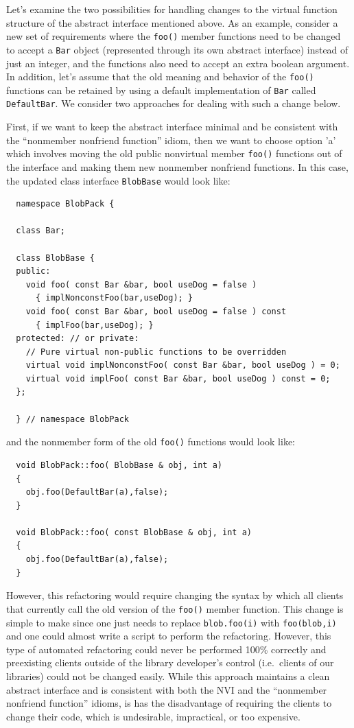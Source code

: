 \documentclass[pdf,ps2pdf,11pt]{SANDreport}
\begin{document}
Let's examine the two possibilities for handling changes to the virtual
function structure of the abstract interface mentioned above.  As an example,
consider a new set of requirements where the {}\texttt{foo()} member functions
need to be changed to accept a {}\texttt{Bar} object (represented through its
own abstract interface) instead of just an integer, and the functions also
need to accept an extra boolean argument.  In addition, let's assume that the
old meaning and behavior of the {}\texttt{foo()} functions can be retained by
using a default implementation of {}\texttt{Bar} called {}\texttt{DefaultBar}.
We consider two approaches for dealing with such a change below.

First, if we want to keep the abstract interface minimal and be consistent
with the ``nonmember nonfriend function'' idiom, then we want to choose option
'a' which involves moving the old public nonvirtual member {}\texttt{foo()}
functions out of the interface and making them new nonmember nonfriend
functions.  In this case, the updated class interface {}\texttt{BlobBase}
would look like:

{\small\begin{verbatim}
  namespace BlobPack {

  class Bar;

  class BlobBase {
  public:
    void foo( const Bar &bar, bool useDog = false )
      { implNonconstFoo(bar,useDog); }
    void foo( const Bar &bar, bool useDog = false ) const
      { implFoo(bar,useDog); }
  protected: // or private:
    // Pure virtual non-public functions to be overridden
    virtual void implNonconstFoo( const Bar &bar, bool useDog ) = 0;
    virtual void implFoo( const Bar &bar, bool useDog ) const = 0;
  };

  } // namespace BlobPack
\end{verbatim}}

{}\noindent{}and the nonmember form of the old {}\texttt{foo()} functions
would look like:

{\small\begin{verbatim}
  void BlobPack::foo( BlobBase & obj, int a)
  {
    obj.foo(DefaultBar(a),false);
  }

  void BlobPack::foo( const BlobBase & obj, int a)
  {
    obj.foo(DefaultBar(a),false);
  }
\end{verbatim}}

However, this refactoring would require changing the syntax by which all
clients that currently call the old version of the {}\texttt{foo()} member
function.  This change is simple to make since one just needs to replace
{}\texttt{blob.foo(i)} with {}\texttt{foo(blob,i)} and one could almost write
a script to perform the refactoring.  However, this type of automated
refactoring could never be performed 100\% correctly and preexisting clients
outside of the library developer's control (i.e.\ clients of our libraries)
could not be changed easily.  While this approach maintains a clean abstract
interface and is consistent with both the NVI and the ``nonmember nonfriend
function'' idioms, is has the disadvantage of requiring the clients to change
their code, which is undesirable, impractical, or too expensive.
\end{document}
